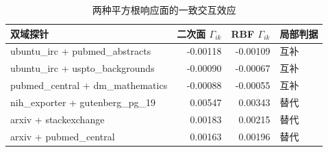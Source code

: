 \begin{table}[htbp]\centering\scriptsize
\caption{两种平方根响应面的一致交互效应}\label{tab:q1-v39-pairs}
\begin{tabular}{lrrl}\toprule 双域探针 & 二次面 $\Gamma_{ik}$ & RBF $\Gamma_{ik}$ & 局部判据\\\midrule
ubuntu\_irc + pubmed\_abstracts & -0.00118 & -0.00109 & 互补 \\
ubuntu\_irc + uspto\_backgrounds & -0.00090 & -0.00067 & 互补 \\
pubmed\_central + dm\_mathematics & -0.00088 & -0.00055 & 互补 \\
nih\_exporter + gutenberg\_pg\_19 & 0.00547 & 0.00343 & 替代 \\
arxiv + stackexchange & 0.00183 & 0.00215 & 替代 \\
arxiv + pubmed\_central & 0.00163 & 0.00196 & 替代 \\
\bottomrule\end{tabular}\end{table}
